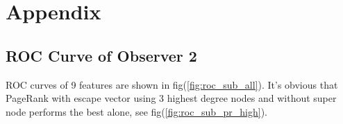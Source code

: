 \documentclass[11pt,a4paper]{article}
\begin{document}


\section*{Appendix}

\subsection*{ROC Curve of Observer 2}

ROC curves of 9 features are shown in fig(\ref{fig:roc_sub_all}).
It's obvious that PageRank with escape vector using 3 highest 
degree nodes and without super node performs the best alone, 
see fig(\ref{fig:roc_sub_pr_high}). 

\begin{figure}[htb]
    \label{fig:subfigures}
    \begin{center}
%
        \\%


\end{center}
\end{figure}
\end{document}
